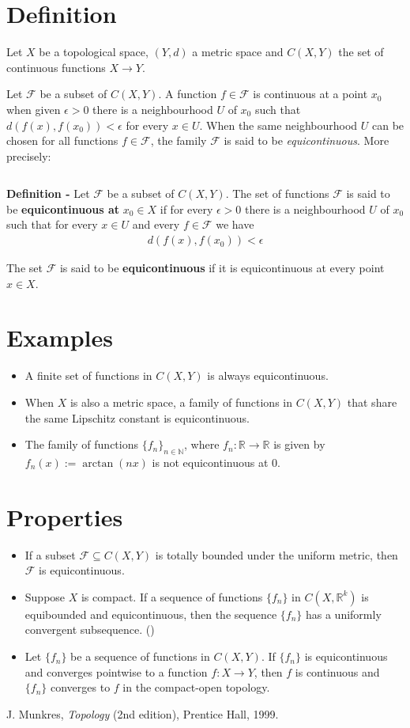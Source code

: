 \documentclass[12pt]{article}
\begin{document}
\section{Definition}

Let $X$ be a topological space, $(Y, d)$ a metric space and $C(X,Y)$ the set of continuous functions $X \to Y$.

Let $\mathcal{F}$ be a subset of $C(X,Y)$. A function $f \in \mathcal{F}$ is continuous at a point $x_0$ when given $\epsilon > 0$ there is a neighbourhood $U$ of $x_0$ such that $d(f(x),f(x_0)) < \epsilon$ for every $x \in U$. When the same neighbourhood $U$ can be chosen for all functions $f \in \mathcal{F}$, the family $\mathcal{F}$ is said to be \emph{equicontinuous}. More precisely:

$\,$

{\bf Definition -} Let $\mathcal{F}$ be a subset of $C(X,Y)$. The set of functions $\mathcal{F}$ is said to be {\bf equicontinuous at} $x_0 \in X$ if for every $\epsilon >0$ there is a neighbourhood $U$ of $x_0$ such that for every $x \in U$ and every $f \in \mathcal{F}$ we have
\begin{align*}
d(f(x),f(x_0)) < \epsilon
\end{align*}

The set $\mathcal{F}$ is said to be {\bf equicontinuous} if it is equicontinuous at every point $x \in X$.

\section{Examples}
\begin{itemize}
\item A finite set of functions in $C(X, Y)$ is always equicontinuous.
\item When $X$ is also a metric space, a family of functions in $C(X,Y)$ that share the same Lipschitz constant is equicontinuous.
\item The family of functions $\{f_n\}_{n \in \mathbb{N}}$, where $f_n:\mathbb{R} \to \mathbb{R}$ is given by $f_n(x):=\arctan (nx)$ is not equicontinuous at $0$.
\end{itemize}

\section{Properties}

\begin{itemize}
\item If a subset $\mathcal{F} \subseteq C(X, Y)$ is totally bounded under the uniform metric, then $\mathcal{F}$ is equicontinuous.
\item Suppose $X$ is compact. If a sequence of functions $\{f_n\}$ in $C(X, \mathbb{R}^k)$ is equibounded and equicontinuous, then the sequence $\{f_n\}$ has a uniformly convergent subsequence. ()
\item Let $\{f_n\}$ be a sequence of functions in $C(X, Y)$. If $\{f_n\}$ is equicontinuous and converges pointwise to a function $f:X \to Y$, then $f$ is continuous and $\{f_n\}$ converges to $f$ in the compact-open topology.
\end{itemize}

\begin{thebibliography}{9}
 J. Munkres, \emph{Topology} (2nd edition), Prentice Hall, 1999.
\end{thebibliography}
\end{document}
